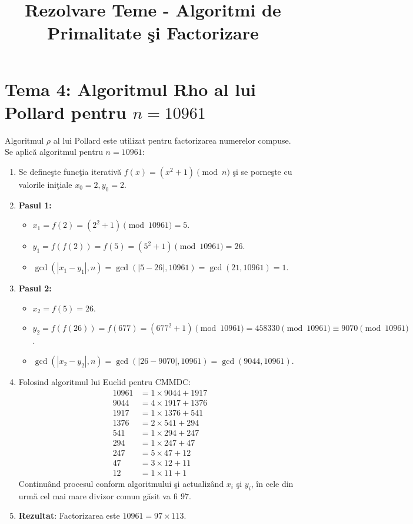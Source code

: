 \documentclass[12pt, a4paper]{article}
\title{Rezolvare Teme - Algoritmi de Primalitate \c{s}i Factorizare}
\author{}
\date{}
\begin{document}
\maketitle
\section*{Tema 4: Algoritmul Rho al lui Pollard pentru $n = 10961$}

Algoritmul $\rho$ al lui Pollard este utilizat pentru factorizarea numerelor compuse. Se aplic\u{a} algoritmul pentru $n = 10961$:

\begin{enumerate}
    \item Se define\c{s}te func\c{t}ia iterativ\u{a} $f(x) = (x^2 + 1) \pmod n$ \c{s}i se porne\c{s}te cu valorile ini\c{t}iale $x_0 = 2, y_0 = 2$.
    \item \textbf{Pasul 1:}
    \begin{itemize}
        \item $x_1 = f(2) = (2^2 + 1) \pmod{10961} = 5$.
        \item $y_1 = f(f(2)) = f(5) = (5^2 + 1) \pmod{10961} = 26$.
        \item $\gcd(|x_1 - y_1|, n) = \gcd(|5 - 26|, 10961) = \gcd(21, 10961) = 1$.
    \end{itemize}
    \item \textbf{Pasul 2:}
    \begin{itemize}
        \item $x_2 = f(5) = 26$.
        \item $y_2 = f(f(26)) = f(677) = (677^2 + 1) \pmod{10961} = 458330 \pmod{10961} \equiv 9070 \pmod{10961}$.
        \item $\gcd(|x_2 - y_2|, n) = \gcd(|26 - 9070|, 10961) = \gcd(9044, 10961)$.
    \end{itemize}
    \item Folosind algoritmul lui Euclid pentru CMMDC:
    \begin{align*}
        10961 &= 1 \times 9044 + 1917 \\
        9044 &= 4 \times 1917 + 1376 \\
        1917 &= 1 \times 1376 + 541 \\
        1376 &= 2 \times 541 + 294 \\
        541 &= 1 \times 294 + 247 \\
        294 &= 1 \times 247 + 47 \\
        247 &= 5 \times 47 + 12 \\
        47 &= 3 \times 12 + 11 \\
        12 &= 1 \times 11 + 1
    \end{align*}
    Continu\^{a}nd procesul conform algoritmului \c{s}i actualiz\^{a}nd $x_i$ \c{s}i $y_i$, \^{i}n cele din urm\u{a} cel mai mare divizor comun g\u{a}sit va fi $97$. 
    \item \textbf{Rezultat}: Factorizarea este $10961 = 97 \times 113$.
\end{enumerate}
\end{document}
